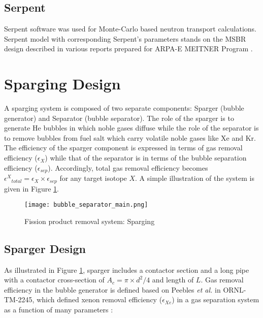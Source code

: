 \begin{itemize}
\subsection{Serpent}

    Serpent software \cite{Lep2014} was used for Monte-Carlo based neutron 
    transport calculations. Serpent model with corresponding Serpent's 
    parameters stands on the MSBR design described in various reports prepared 
    for ARPA-E MEITNER Program \cite{rykhlevskii_fuel_2019, 
    rykhlevskii_modeling_2019, rykhlevskii_fuel_2020}.

\FloatBarrier

\section{Sparging Design}

    A sparging system is composed of two separate components: Sparger (bubble 
    generator) and Separator (bubble separator). The role of the sparger is to 
    generate He bubbles in which noble gases diffuse while the role of the 
    separator is to remove bubbles from fuel salt which carry volatile noble 
    gases like Xe and Kr. The efficiency of the sparger component is expressed 
    in terms of gas removal efficiency ($\epsilon_{X}$) while that of the 
    separator is in terms of the bubble separation efficiency 
    ($\epsilon_{sep}$). Accordingly, total gas removal efficiency becomes 
    ${\epsilon^{X}}_{total} = \epsilon_{X} \times \epsilon_{sep}$ for any 
    target isotope $X$. A simple illustration of the system is given in Figure 
    \ref{fig:sparging}.

    \begin{figure}[htbp!]
        \begin{center}
            \texttt{[image: bubble\_separator\_main.png]}
        \end{center}
        \caption{Fission product removal system: Sparging}
        \label{fig:sparging}
    \end{figure}

\subsection{Sparger Design}

 As illustrated in Figure \ref{fig:sparging}, sparger includes a contactor 
 section and a long pipe with a contactor cross-section of $A_c = \pi\times 
 d^2/4$ and length of $L$. Gas removal efficiency in the bubble generator is 
 defined based on Peebles \emph{et al.} in 
 ORNL-TM-2245, which defined xenon removal efficiency
($\epsilon_{Xe}$) in a gas separation system as a function of many parameters \cite{peebles_removal_1968}:


\end{itemize}
